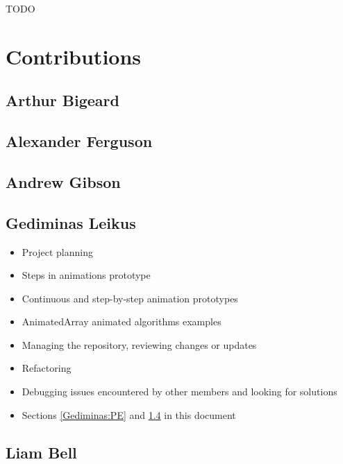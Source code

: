 \documentclass{l3proj}
\begin{document}
TODO

\section{Contributions}
\subsection{Arthur Bigeard}
\subsection{Alexander Ferguson}
\subsection{Andrew Gibson}
\subsection{Gediminas Leikus}
\label{Gediminas:Con}
\begin{itemize}
	\item Project planning
	\item Steps in animations prototype
	\item Continuous and step-by-step animation prototypes
	\item AnimatedArray animated algorithms examples
	\item Managing the repository, reviewing changes or updates
	\item Refactoring
	\item Debugging issues encountered by other members and looking for solutions
	\item Sections \ref{Gediminas:PE} and \ref{Gediminas:Con} in this document
\end{itemize}
\subsection{Liam Bell}



\end{document}
